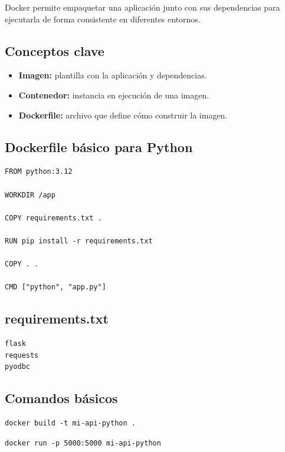 \documentclass[12pt]{article}
\begin{document}
Docker permite empaquetar una aplicación junto con sus dependencias para ejecutarla de forma consistente en diferentes entornos.

\subsection{Conceptos clave}

\begin{itemize}
    \item \textbf{Imagen:} plantilla con la aplicación y dependencias.
    \item \textbf{Contenedor:} instancia en ejecución de una imagen.
    \item \textbf{Dockerfile:} archivo que define cómo construir la imagen.
\end{itemize}

\subsection{Dockerfile básico para Python}

\begin{lstlisting}
FROM python:3.12

WORKDIR /app

COPY requirements.txt .

RUN pip install -r requirements.txt

COPY . .

CMD ["python", "app.py"]
\end{lstlisting}

\subsection{requirements.txt}

\begin{lstlisting}
flask
requests
pyodbc
\end{lstlisting}

\subsection{Comandos básicos}

\begin{lstlisting}
docker build -t mi-api-python .
\end{lstlisting}

\begin{lstlisting}
docker run -p 5000:5000 mi-api-python
\end{lstlisting}
\end{document}
